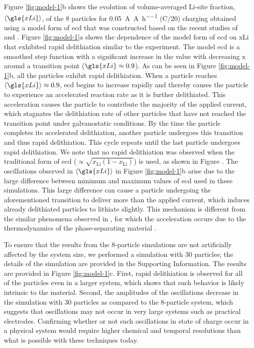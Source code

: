 \documentclass{WileyMSP-template}
\begin{document}
Figure \ref{fig:model-1}b shows the evolution of volume-averaged
Li-site fraction, $\left\langle \gls{xLi} \right\rangle$, of the 8
particles for \SI{0.05}{\ampere\per\ampere\per\hour} (C/20) charging
obtained using a model form of \gls{ecd} that was constructed based on
the recent studies of \nca{} \cite{chueh2021} and \nmc{}
\cite{mukherjee2017, chiang2020, tsai2018}. Figure \ref{fig:model-1}a
shows the dependence of the model form of \gls{ecd} on \gls{xLi} that
exhibited rapid delithiation similar to the experiment. The model
\gls{ecd} is a smoothed step function with a significant increase in
the value with decreasing x around a transition point
($\gls{xLi}\approx0.9$). As can be seen in Figure \ref{fig:model-1}b,
all the particles exhibit rapid delithiation. When a particle reaches
$\left\langle \gls{xLi} \right\rangle\approx0.9$, \gls{ecd} begins to
increase rapidly and thereby causes the particle to experience an
accelerated reaction rate as it is further delithiated. This
acceleration causes the particle to contribute the majority of the
applied current, which stagnates the delithiation rate of other
particles that have not reached the transition point under
galvanostatic conditions. By the time the particle completes its
accelerated delithiation, another particle undergoes this transition
and thus rapid delithiation. This cycle repeats until the last
particle undergoes rapid delithiation.  We note that no rapid
delithiation was observed when the traditional form of \gls{ecd}
($\propto\sqrt{{x_{\textrm{Li}}}(1-{x_{\textrm{Li}}})}$) is
used\cite{newman1993, newman1996, newman1994, newman1995}, as shown in
Figure . The oscillations observed in
$\left\langle \gls{xLi} \right\rangle$ in Figure \ref{fig:model-1}b
arise due to the large difference between minimum and maximum values
of \gls{ecd} used in these simulations. This large difference can
cause a particle undergoing the aforementioned transition to deliver
more than the applied current, which induces already delithiated
particles to lithiate slightly. This mechanism is different from the
similar phenomena observed in , for which the
acceleration occurs due to the thermodynamics of the phase-separating
material \cite{thornton2015}.

To ensure that the results from the 8-particle simulations are not
artificially affected by the system size, we performed a simulation
with 30 particles; the details of the simulation are provided in the
Supporting Information. The results are provided in Figure
\ref{fig:model-1}c. First, rapid delithiation is observed for all of
the particles even in a larger system, which shows that such behavior
is likely intrinsic to the material. Second, the amplitudes of the
oscillations decrease in the simulation with 30 particles as compared
to the 8-particle system, which suggests that oscillations may not
occur in very large systems such as practical electrodes.  Confirming
whether or not such oscillations in state of charge occur in a
physical system would require higher chemical and temporal resolutions
than what is possible with these techniques today.
\end{document}

